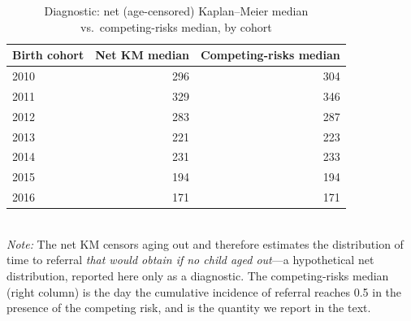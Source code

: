 \begin{table}[htbp]\centering
\caption{Diagnostic: net (age-censored) Kaplan--Meier median vs.\ competing-risks median, by cohort}
\label{tab:E1d}
\footnotesize
\setlength{\tabcolsep}{4pt}
\begin{tabular}{lrr}
\toprule
Birth cohort & Net KM median & Competing-risks median \\
\midrule
2010 & 296 & 304 \\
2011 & 329 & 346 \\
2012 & 283 & 287 \\
2013 & 221 & 223 \\
2014 & 231 & 233 \\
2015 & 194 & 194 \\
2016 & 171 & 171 \\
\bottomrule
\end{tabular}
\\[3pt]{\footnotesize \textit{Note:} The net KM censors aging out and therefore estimates the distribution of time to referral \emph{that would obtain if no child aged out}---a hypothetical net distribution, reported here only as a diagnostic. The competing-risks median (right column) is the day the cumulative incidence of referral reaches 0.5 in the presence of the competing risk, and is the quantity we report in the text.}
\end{table}
